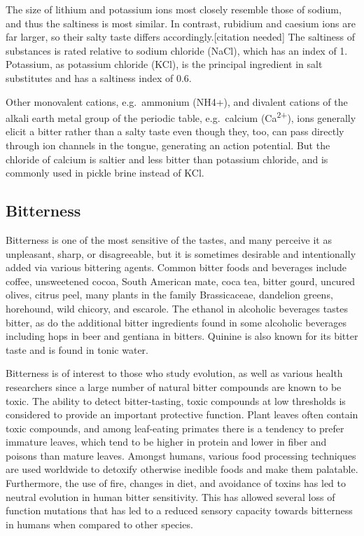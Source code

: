 The size of lithium and potassium ions most closely resemble those of sodium, and thus the saltiness is most similar. In contrast, rubidium and caesium ions are far larger, so their salty taste differs accordingly.{[}citation needed{]} The saltiness of substances is rated relative to sodium chloride (NaCl), which has an index of 1. Potassium, as potassium chloride (KCl), is the principal ingredient in salt substitutes and has a saltiness index of 0.6.

Other monovalent cations, e.g.~ammonium (NH4+), and divalent cations of the alkali earth metal group of the periodic table, e.g.~calcium (Ca\textsuperscript{2+}), ions generally elicit a bitter rather than a salty taste even though they, too, can pass directly through ion channels in the tongue, generating an action potential. But the chloride of calcium is saltier and less bitter than potassium chloride, and is commonly used in pickle brine instead of KCl.

\hypertarget{bitterness}{%
\subsection{Bitterness}\label{bitterness}}

Bitterness is one of the most sensitive of the tastes, and many perceive it as unpleasant, sharp, or disagreeable, but it is sometimes desirable and intentionally added via various bittering agents. Common bitter foods and beverages include coffee, unsweetened cocoa, South American mate, coca tea, bitter gourd, uncured olives, citrus peel, many plants in the family Brassicaceae, dandelion greens, horehound, wild chicory, and escarole. The ethanol in alcoholic beverages tastes bitter, as do the additional bitter ingredients found in some alcoholic beverages including hops in beer and gentiana in bitters. Quinine is also known for its bitter taste and is found in tonic water.

Bitterness is of interest to those who study evolution, as well as various health researchers since a large number of natural bitter compounds are known to be toxic. The ability to detect bitter-tasting, toxic compounds at low thresholds is considered to provide an important protective function. Plant leaves often contain toxic compounds, and among leaf-eating primates there is a tendency to prefer immature leaves, which tend to be higher in protein and lower in fiber and poisons than mature leaves. Amongst humans, various food processing techniques are used worldwide to detoxify otherwise inedible foods and make them palatable. Furthermore, the use of fire, changes in diet, and avoidance of toxins has led to neutral evolution in human bitter sensitivity. This has allowed several loss of function mutations that has led to a reduced sensory capacity towards bitterness in humans when compared to other species.

